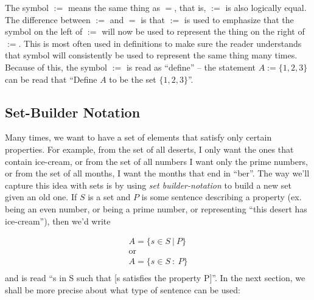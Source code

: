 \documentclass{book}
\begin{document}
The symbol $:=$ means the same thing as $=$, that is, $:=$ is also logically equal. The difference between $:=$ and $=$
is that $:=$ is used to emphasize that the symbol on the left of $:=$ will now be used to represent the thing on the
right of $:=$. This is most often used in definitions to make sure the reader understands that symbol will consistently
be used to represent the same thing many times. Because of this, the symbol $:=$ is read as ``define'' -- the statement
$A := \{1,2,3\}$ can be read that ``Define $A$ to be the set $\{1,2,3\}$''.



\subsection*{Set-Builder Notation}


Many times, we want to have a set of elements that satisfy only certain properties. For example, from the set
of all deserts, I only want the ones that contain ice-cream, or from the set of all numbers I want only the
prime numbers, or from the set of all months, I want the months that end in ``ber''. The way we'll capture
this idea with sets is by using \emph{set builder-notation} to build a new set given an old one. If $S$ is a
set and $P$ is some sentence describing a property (ex. being an even number, or being a prime number, or
representing ``this desert has ice-cream''), then we'd write


\begin{gather*}
	A = \{s \in S\ |\ P\}\\
	\text{or}\\
	A = \{s \in S\ :\ P\}\\
\end{gather*}
and is read ``s in S such that [s satisfies the property P]''. In the next section, we shall be more precise
about what type of sentence can be used:
\end{document}
